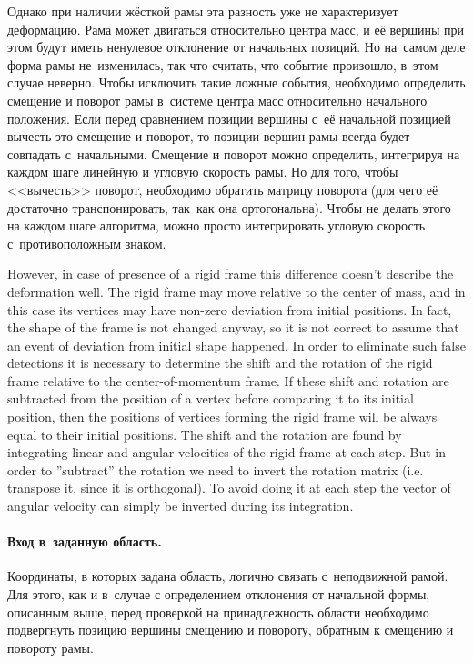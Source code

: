 \documentclass[a4paper, 12pt, titlepage]{extarticle}
\begin{document}
\begin{original}
        Однако при наличии жёсткой рамы эта разность уже не характеризует деформацию. Рама может
        двигаться относительно центра масс, и её вершины при этом будут иметь ненулевое отклонение
        от начальных позиций. Но на~самом деле форма рамы не~изменилась, так что считать, что событие
        произошло, в~этом случае неверно. Чтобы исключить такие ложные события, необходимо определить смещение и поворот
        рамы в~системе центра масс относительно начального положения. Если перед сравнением позиции
        вершины с~её начальной позицией вычесть это смещение и поворот, то позиции вершин рамы
        всегда будет совпадать с~начальными. Смещение и поворот можно определить, интегрируя на
        каждом шаге линейную и угловую скорость рамы. Но для того, чтобы <<вычесть>> поворот,
        необходимо обратить матрицу поворота (для чего её достаточно транспонировать, так~как она
        ортогональна). Чтобы не делать этого на каждом шаге алгоритма, можно просто интегрировать угловую
        скорость с~противоположным знаком.
\end{original}

        However, in case of presence of a rigid frame this difference doesn't describe the
        deformation well. The rigid frame may move relative to the center of mass, and in this case
        its vertices may have non-zero deviation from initial positions. In fact, the shape of the
        frame is not changed anyway, so it is not correct to assume that an event of deviation from
        initial shape happened. In order to eliminate such false detections it is necessary to
        determine the shift and the rotation of the rigid frame relative to the center-of-momentum
        frame.  If these shift and rotation are subtracted from the position of a vertex before
        comparing it to its initial position, then the positions of vertices forming the rigid frame
        will be always equal to their initial positions. The shift and the rotation are found by
        integrating linear and angular velocities of the rigid frame at each step. But in order to
        ''subtract'' the rotation we need to invert the rotation matrix (i.e. transpose it, since it
        is orthogonal). To avoid doing it at each step the vector of angular velocity can simply be
        inverted during its integration.

\begin{original}
        \paragraph{Вход в~заданную область.}
        Координаты, в которых задана область, логично связать с~неподвижной рамой. Для этого, как и
        в~случае с определением отклонения от начальной формы, описанным выше, перед проверкой на принадлежность
        области необходимо подвергнуть позицию вершины смещению и повороту, обратным к смещению и
        повороту рамы.
\end{original}
\end{document}
